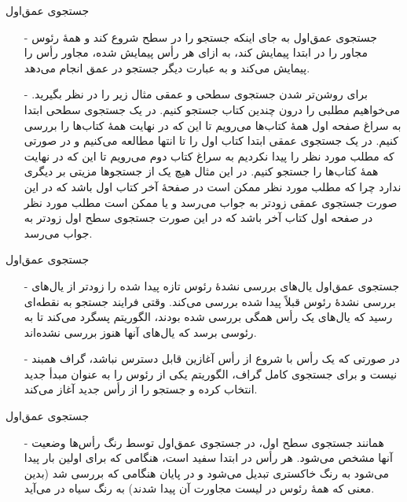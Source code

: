 
\begin{frame}{‌جستجوی عمق‌اول}
\begin{itemize}\itemr
\item[-]
جستجوی عمق‌اول به جای اینکه جستجو را در سطح شروع کند و همهٔ رئوس مجاور را در ابتدا پیمایش کند، به ازای هر رأس پیمایش شده، مجاور رأس را پیمایش می‌کند و به عبارت دیگر جستجو در عمق انجام می‌دهد.
\item[-]
برای روشن‌تر شدن جستجوی سطحی و عمقی مثال زیر را در نظر بگیرید. می‌خواهیم مطلبی را درون چندین کتاب جستجو کنیم. در یک جستجوی سطحی ابتدا به سراغ صفحه اول همهٔ کتاب‌ها می‌رویم تا این که در نهایت همهٔ کتاب‌ها را بررسی کنیم. در یک جستجوی عمقی ابتدا کتاب اول را تا انتها مطالعه می‌کنیم و در صورتی که مطلب مورد نظر را پیدا نکردیم به سراغ کتاب دوم می‌رویم تا این که در نهایت همهٔ کتاب‌ها را جستجو کنیم. در این مثال هیچ یک از جستجوها مزیتی بر دیگری ندارد چرا که مطلب مورد نظر ممکن است در صفحهٔ آخر کتاب اول باشد که در این صورت جستجوی عمقی زودتر به جواب می‌رسد و یا ممکن است مطلب مورد نظر در صفحه اول کتاب آخر باشد که در این صورت جستجوی سطح اول زودتر به جواب می‌رسد.
\end{itemize}
\end{frame}


\begin{frame}{‌جستجوی عمق‌اول}
\begin{itemize}\itemr
\item[-]
جستجوی عمق‌اول یال‌های بررسی نشدهٔ رئوس تازه پیدا شده را زودتر از یال‌های بررسی نشدهٔ رئوس قبلاً پیدا شده بررسی می‌کند. وقتی فرایند جستجو به نقطه‌ای رسید که یال‌های یک رأس همگی بررسی شده بودند، الگوریتم پسگرد می‌کند تا به رئوسی برسد که یال‌های آنها هنوز بررسی نشده‌اند.
\item[-]
در صورتی که یک رأس با شروع از رأس آغازین قابل دسترس نباشد، گراف همبند نیست و برای جستجوی کامل گراف، الگوریتم یکی از رئوس را به عنوان مبدأ جدید انتخاب کرده و جستجو را از رأس جدید آغاز می‌‌کند.
\end{itemize}
\end{frame}


\begin{frame}{‌جستجوی عمق‌اول}
\begin{itemize}\itemr
\item[-]
همانند جستجوی سطح اول، در جستجوی عمق‌اول توسط رنگ رأس‌ها وضعیت آنها مشخص می‌شود. هر رأس در ابتدا سفید است، هنگامی که برای اولین بار پیدا می‌شود به رنگ خاکستری تبدیل می‌شود و در پایان هنگامی که بررسی شد (بدین معنی که همهٔ رئوس در لیست مجاورت آن پیدا شدند) به رنگ سیاه در می‌آید.
\end{itemize}
\end{frame}


